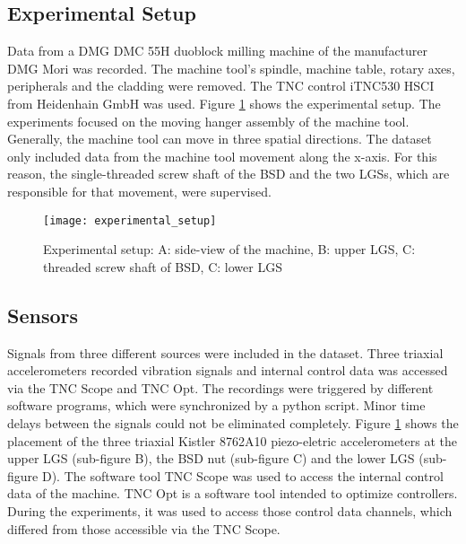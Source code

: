 \subsection{Experimental Setup}
Data from a DMG DMC 55H duoblock milling machine of the manufacturer DMG Mori was recorded. The machine tool’s spindle, machine table, rotary axes, peripherals and the cladding were removed. The TNC control iTNC530 HSCI from Heidenhain GmbH was used. Figure \ref{fig:experimental_setup} shows the experimental setup. The experiments focused on the moving hanger assembly of the machine tool. Generally, the machine tool can move in three spatial directions. The dataset only included data from the machine tool movement along the x-axis. For this reason, the single-threaded screw shaft of the BSD and the two LGSs, which are responsible for that movement, were supervised.

\begin{figure}[H]
  \centering
  \texttt{[image: experimental\_setup]}
  \caption {Experimental setup: A: side-view of the machine, B: upper LGS, C: threaded screw shaft of BSD, C: lower LGS}
  \label{fig:experimental_setup}
\end{figure}

\subsection{Sensors}
Signals from three different sources were included in the dataset. Three triaxial accelerometers recorded vibration signals and internal control data was accessed via the TNC Scope and TNC Opt. The recordings were triggered by different software programs, which were synchronized by a python script. Minor time delays between the signals could not be eliminated completely. Figure \ref{fig:experimental_setup} shows the placement of the three triaxial Kistler 8762A10 piezo-eletric accelerometers at the upper LGS (sub-figure B), the BSD nut (sub-figure C) and the lower LGS (sub-figure D). The software tool TNC Scope was used to access the internal control data of the machine. TNC Opt is a software tool intended to optimize controllers. During the experiments, it was used to access those control data channels, which differed from those accessible via the TNC Scope.

